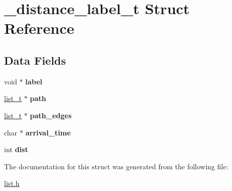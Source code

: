 \hypertarget{struct__distance__label__t}{}\section{\+\_\+distance\+\_\+label\+\_\+t Struct Reference}
\label{struct__distance__label__t}
\subsection*{Data Fields}
\begin{DoxyCompactItemize}
\item 
\hypertarget{struct__distance__label__t_a9727371f649142a741d5070a82f5878d}{}void $\ast$ {\bfseries label}\label{struct__distance__label__t_a9727371f649142a741d5070a82f5878d}

\item 
\hypertarget{struct__distance__label__t_af33f0d4f68780ceb38e73c1101274d79}{}\hyperlink{struct__list__t}{list\+\_\+t} $\ast$ {\bfseries path}\label{struct__distance__label__t_af33f0d4f68780ceb38e73c1101274d79}

\item 
\hypertarget{struct__distance__label__t_a80b84820e61123acfebb03bc7c233d9f}{}\hyperlink{struct__list__t}{list\+\_\+t} $\ast$ {\bfseries path\+\_\+edges}\label{struct__distance__label__t_a80b84820e61123acfebb03bc7c233d9f}

\item 
\hypertarget{struct__distance__label__t_a8322cd83cd23a5d8c4ae864d2d281632}{}char $\ast$ {\bfseries arrival\+\_\+time}\label{struct__distance__label__t_a8322cd83cd23a5d8c4ae864d2d281632}

\item 
\hypertarget{struct__distance__label__t_adbd84fd1b26dc8fd8eab79a772216aee}{}int {\bfseries dist}\label{struct__distance__label__t_adbd84fd1b26dc8fd8eab79a772216aee}

\end{DoxyCompactItemize}


The documentation for this struct was generated from the following file\+:\begin{DoxyCompactItemize}
\item 
\hyperlink{list_8h}{list.\+h}\end{DoxyCompactItemize}
